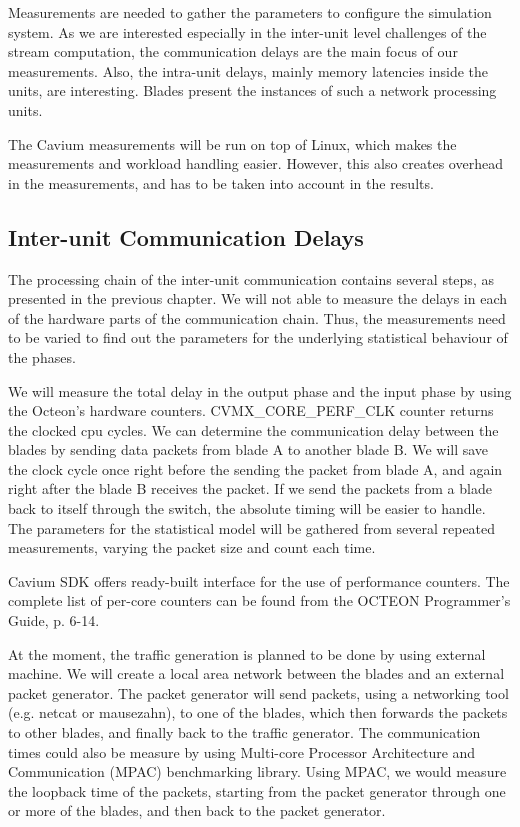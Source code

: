 Measurements are needed to gather the parameters to configure the simulation system. As we are interested especially in the inter-unit level challenges of the stream computation, the communication delays are the main focus of our measurements. Also, the intra-unit delays, mainly memory latencies inside the units, are interesting. Blades present the instances of such a network processing units.

The Cavium measurements will be run on top of Linux, which makes the measurements and workload handling easier. However, this also creates overhead in the measurements, and has to be taken into account in the results.

\subsection{Inter-unit Communication Delays}
The processing chain of the inter-unit communication contains several steps, as presented in the previous chapter. We will not able to measure the delays in each of the hardware parts of the communication chain. Thus, the measurements need to be varied to find out the parameters for the underlying statistical behaviour of the phases.

We will measure the total delay in the output phase and the input phase by using the Octeon's hardware counters. CVMX\_CORE\_PERF\_CLK counter returns the clocked cpu cycles. We can determine the communication delay between the blades by sending data packets from blade A to another blade B. We will save the clock cycle once right before the sending the packet from blade A, and again right after the blade B receives the packet. If we send the packets from a blade back to itself through the switch, the absolute timing will be easier to handle. The parameters for the statistical model will be gathered from several repeated measurements, varying the packet size and count each time.

Cavium SDK offers ready-built interface for the use of performance counters. The complete list of per-core counters can be found from the OCTEON Programmer's Guide, p. 6-14.

At the moment, the traffic generation is planned to be done by using external machine. We will create a local area network between the blades and an external packet generator. The packet generator will send packets, using a networking tool (e.g. netcat or mausezahn), to one of the blades, which then forwards the packets to other blades, and finally back to the traffic generator. The communication times could also be measure by using Multi-core Processor Architecture and Communication (MPAC) benchmarking library. Using MPAC, we would measure the loopback time of the packets, starting from the packet generator through one or more of the blades, and then back to the packet generator.

